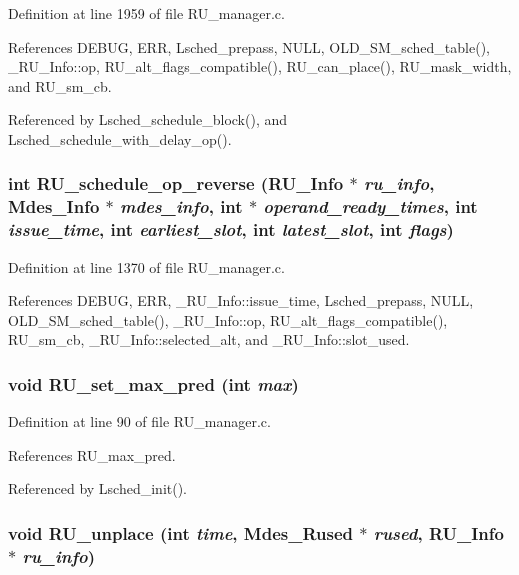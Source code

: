 Definition at line 1959 of file RU\_\-manager.c.

References DEBUG, ERR, Lsched\_\-prepass, NULL, OLD\_\-SM\_\-sched\_\-table(), \_\-RU\_\-Info::op, RU\_\-alt\_\-flags\_\-compatible(), RU\_\-can\_\-place(), RU\_\-mask\_\-width, and RU\_\-sm\_\-cb.

Referenced by Lsched\_\-schedule\_\-block(), and Lsched\_\-schedule\_\-with\_\-delay\_\-op().
\subsubsection{\setlength{\rightskip}{0pt plus 5cm}int RU\_\-schedule\_\-op\_\-reverse (\bf{RU\_\-Info} $\ast$ {\em ru\_\-info}, Mdes\_\-Info $\ast$ {\em mdes\_\-info}, int $\ast$ {\em operand\_\-ready\_\-times}, int {\em issue\_\-time}, int {\em earliest\_\-slot}, int {\em latest\_\-slot}, int {\em flags})}\label{RU__manager_8c_4041d3ebf720b70c9b966220065b11ce}




Definition at line 1370 of file RU\_\-manager.c.

References DEBUG, ERR, \_\-RU\_\-Info::issue\_\-time, Lsched\_\-prepass, NULL, OLD\_\-SM\_\-sched\_\-table(), \_\-RU\_\-Info::op, RU\_\-alt\_\-flags\_\-compatible(), RU\_\-sm\_\-cb, \_\-RU\_\-Info::selected\_\-alt, and \_\-RU\_\-Info::slot\_\-used.
\subsubsection{\setlength{\rightskip}{0pt plus 5cm}void RU\_\-set\_\-max\_\-pred (int {\em max})}\label{RU__manager_8c_87347d084aae40509198e30f58e6e478}




Definition at line 90 of file RU\_\-manager.c.

References RU\_\-max\_\-pred.

Referenced by Lsched\_\-init().
\subsubsection{\setlength{\rightskip}{0pt plus 5cm}void RU\_\-unplace (int {\em time}, Mdes\_\-Rused $\ast$ {\em rused}, \bf{RU\_\-Info} $\ast$ {\em ru\_\-info})}\label{RU__manager_8c_a90890a46cfcd6cc9ef17c0726c5d39f}




